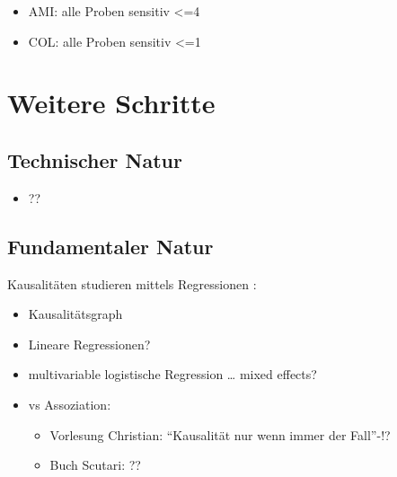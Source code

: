 \documentclass[
]{article}
\providecommand{\tightlist}{%
  \setlength{\itemsep}{0pt}\setlength{\parskip}{0pt}}
\begin{document}
\begin{itemize}
\tightlist
\item
  AMI: alle Proben sensitiv \textless=4
\item
  COL: alle Proben sensitiv \textless=1
\end{itemize}

\hypertarget{weitere-schritte}{%
\section{Weitere Schritte}\label{weitere-schritte}}

\hypertarget{technischer-natur}{%
\subsection{Technischer Natur}\label{technischer-natur}}

\begin{itemize}
\tightlist
\item
  ??
\end{itemize}

\hypertarget{fundamentaler-natur}{%
\subsection{Fundamentaler Natur}\label{fundamentaler-natur}}

Kausalitäten studieren mittels Regressionen :

\begin{itemize}
\tightlist
\item
  Kausalitätsgraph
\item
  Lineare Regressionen?
\item
  multivariable logistische Regression \ldots{} mixed effects?
\end{itemize}

\newpage

\begin{itemize}
\tightlist
\item
  vs Assoziation:

  \begin{itemize}
  \tightlist
  \item
    Vorlesung Christian: ``Kausalität nur wenn immer der Fall''-!?
  \item
    Buch Scutari: ??
  \end{itemize}
\end{itemize}
\end{document}
